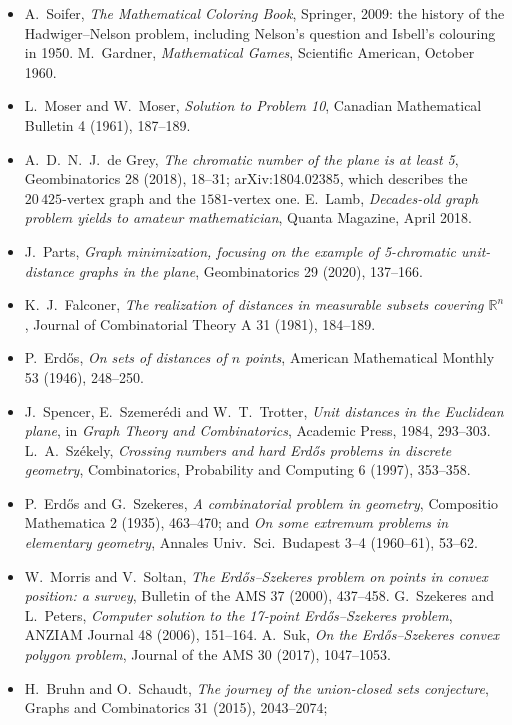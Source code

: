 \begin{itemize}
\item A.~Soifer, \emph{The Mathematical Coloring Book}, Springer, 2009: the history of the Hadwiger--Nelson problem, including Nelson's question and
Isbell's colouring in 1950. M.~Gardner, \emph{Mathematical Games}, Scientific American, October 1960.
\item L.~Moser and W.~Moser, \emph{Solution to Problem 10}, Canadian Mathematical Bulletin 4 (1961), 187--189.
\item A.~D.~N.~J.~de Grey, \emph{The chromatic number of the plane is at least 5}, Geombinatorics 28 (2018), 18--31; arXiv:1804.02385, which
describes the $20\,425$-vertex graph and the $1581$-vertex one. E.~Lamb, \emph{Decades-old graph problem yields to amateur mathematician}, Quanta
Magazine, April 2018.
\item J.~Parts, \emph{Graph minimization, focusing on the example of 5-chromatic unit-distance graphs in the plane}, Geombinatorics 29 (2020),
137--166.
\item K.~J.~Falconer, \emph{The realization of distances in measurable subsets covering $\mathbb R^n$}, Journal of Combinatorial Theory A 31 (1981),
184--189.
\item P.~Erd\H os, \emph{On sets of distances of $n$ points}, American Mathematical Monthly 53 (1946), 248--250.
\item J.~Spencer, E.~Szemer\'edi and W.~T.~Trotter, \emph{Unit distances in the Euclidean plane}, in \emph{Graph Theory and Combinatorics}, Academic
Press, 1984, 293--303. L.~A.~Sz\'ekely, \emph{Crossing numbers and hard Erd\H os problems in discrete geometry}, Combinatorics, Probability and
Computing 6 (1997), 353--358.
\item P.~Erd\H os and G.~Szekeres, \emph{A combinatorial problem in geometry}, Compositio Mathematica 2 (1935), 463--470; and \emph{On some extremum
problems in elementary geometry}, Annales Univ.\ Sci.\ Budapest 3--4 (1960--61), 53--62.
\item W.~Morris and V.~Soltan, \emph{The Erd\H os--Szekeres problem on points in convex position: a survey}, Bulletin of the AMS 37 (2000), 437--458.
G.~Szekeres and L.~Peters, \emph{Computer solution to the 17-point Erd\H os--Szekeres problem}, ANZIAM Journal 48 (2006), 151--164.
A.~Suk, \emph{On the Erd\H os--Szekeres convex polygon problem}, Journal of the AMS 30 (2017), 1047--1053.
\item H.~Bruhn and O.~Schaudt, \emph{The journey of the union-closed sets conjecture}, Graphs and Combinatorics 31 (2015), 2043--2074;

\end{itemize}

